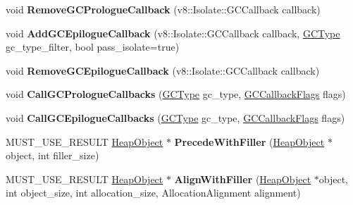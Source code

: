 \begin{DoxyCompactItemize}
\item 
void {\bfseries Remove\+G\+C\+Prologue\+Callback} (v8\+::\+Isolate\+::\+G\+C\+Callback callback)\hypertarget{classv8_1_1internal_1_1_heap_aab9b1c6c5de8bcb20a47d58d7f7b3e42}{}\label{classv8_1_1internal_1_1_heap_aab9b1c6c5de8bcb20a47d58d7f7b3e42}

\item 
void {\bfseries Add\+G\+C\+Epilogue\+Callback} (v8\+::\+Isolate\+::\+G\+C\+Callback callback, \hyperlink{namespacev8_ac109d6f27e0c0f9ef4e98bcf7a806cf2}{G\+C\+Type} gc\+\_\+type\+\_\+filter, bool pass\+\_\+isolate=true)\hypertarget{classv8_1_1internal_1_1_heap_ad275cbc669915b3c1bd970daff53e654}{}\label{classv8_1_1internal_1_1_heap_ad275cbc669915b3c1bd970daff53e654}

\item 
void {\bfseries Remove\+G\+C\+Epilogue\+Callback} (v8\+::\+Isolate\+::\+G\+C\+Callback callback)\hypertarget{classv8_1_1internal_1_1_heap_ac47a30620f01deca98db217b3beca922}{}\label{classv8_1_1internal_1_1_heap_ac47a30620f01deca98db217b3beca922}

\item 
void {\bfseries Call\+G\+C\+Prologue\+Callbacks} (\hyperlink{namespacev8_ac109d6f27e0c0f9ef4e98bcf7a806cf2}{G\+C\+Type} gc\+\_\+type, \hyperlink{namespacev8_a247c37a849f4d6c293b9b16e94e1944b}{G\+C\+Callback\+Flags} flags)\hypertarget{classv8_1_1internal_1_1_heap_a6decd34fd1ede69b1abfa5d6cdadf5a4}{}\label{classv8_1_1internal_1_1_heap_a6decd34fd1ede69b1abfa5d6cdadf5a4}

\item 
void {\bfseries Call\+G\+C\+Epilogue\+Callbacks} (\hyperlink{namespacev8_ac109d6f27e0c0f9ef4e98bcf7a806cf2}{G\+C\+Type} gc\+\_\+type, \hyperlink{namespacev8_a247c37a849f4d6c293b9b16e94e1944b}{G\+C\+Callback\+Flags} flags)\hypertarget{classv8_1_1internal_1_1_heap_aa35977b5f7964df1411f52007cbf521a}{}\label{classv8_1_1internal_1_1_heap_aa35977b5f7964df1411f52007cbf521a}

\item 
M\+U\+S\+T\+\_\+\+U\+S\+E\+\_\+\+R\+E\+S\+U\+LT \hyperlink{classv8_1_1internal_1_1_heap_object}{Heap\+Object} $\ast$ {\bfseries Precede\+With\+Filler} (\hyperlink{classv8_1_1internal_1_1_heap_object}{Heap\+Object} $\ast$object, int filler\+\_\+size)\hypertarget{classv8_1_1internal_1_1_heap_a872b61bb26d3d4af5d3ac1ced1f794ef}{}\label{classv8_1_1internal_1_1_heap_a872b61bb26d3d4af5d3ac1ced1f794ef}

\item 
M\+U\+S\+T\+\_\+\+U\+S\+E\+\_\+\+R\+E\+S\+U\+LT \hyperlink{classv8_1_1internal_1_1_heap_object}{Heap\+Object} $\ast$ {\bfseries Align\+With\+Filler} (\hyperlink{classv8_1_1internal_1_1_heap_object}{Heap\+Object} $\ast$object, int object\+\_\+size, int allocation\+\_\+size, Allocation\+Alignment alignment)\hypertarget{classv8_1_1internal_1_1_heap_a165b7034ca21401502419f663ce13987}{}\label{classv8_1_1internal_1_1_heap_a165b7034ca21401502419f663ce13987}


\end{DoxyCompactItemize}
